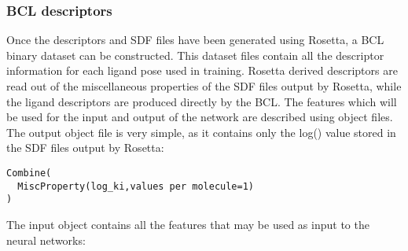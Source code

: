\subsubsection{BCL descriptors}

Once the descriptors and SDF files have been generated using Rosetta, a BCL binary dataset can be constructed.
This dataset files contain all the descriptor information for each ligand pose used in training.
Rosetta derived descriptors are read out of the miscellaneous properties of the SDF files output by Rosetta, while the ligand descriptors are produced directly by the BCL.
The features which will be used for the input and output of the network are described using object files.
The output object file is very simple, as it contains only the log(\ki) value stored in the SDF files output by Rosetta:
\singlespace
\begin{verbatim}
Combine(
  MiscProperty(log_ki,values per molecule=1)
)
\end{verbatim}
\doublespace
The input object contains all the features that may be used as input to the neural networks:
\singlespace

